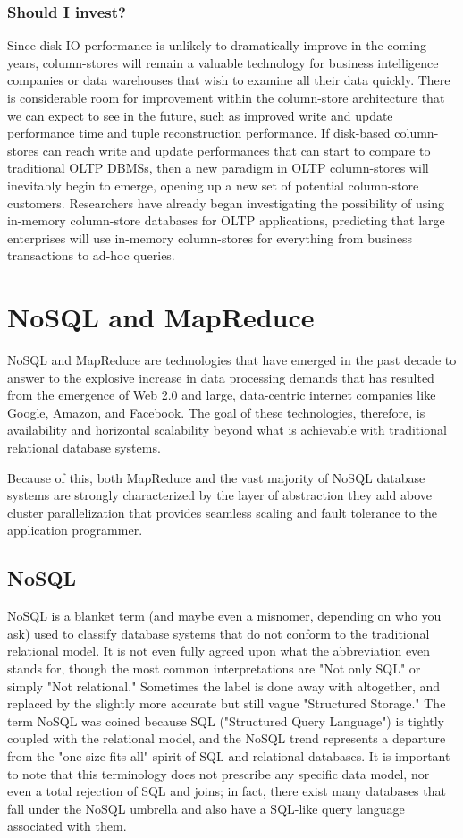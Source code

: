 \documentclass[11pt,a4paper]{report}
\begin{document}
\subsection{Should I invest?}
Since disk IO performance is unlikely to dramatically improve in the coming years, column-stores will remain a valuable technology for business intelligence companies or data warehouses that wish to examine all their data quickly. There is considerable room for improvement within the column-store architecture that we can expect to see in the future, such as improved write and update performance time and tuple reconstruction performance. If disk-based column-stores can reach write and update performances that can start to compare to traditional OLTP DBMSs, then a new paradigm in OLTP column-stores will inevitably begin to emerge, opening up a new set of potential column-store customers. Researchers have already began investigating the possibility of using in-memory column-store databases for OLTP applications, predicting that large enterprises will use in-memory column-stores for everything from business transactions to ad-hoc queries. \cite{plattner2009common}

\chapter{NoSQL and MapReduce}
NoSQL and MapReduce are technologies that have emerged in the past decade to answer to the explosive increase in data processing demands that has resulted from the emergence of Web 2.0 and large, data-centric internet companies like Google, Amazon, and Facebook.\cite{leavitt2010will} The goal of these technologies, therefore, is availability and horizontal scalability beyond what is achievable with traditional relational database systems.

Because of this, both MapReduce and the vast majority of NoSQL database systems are strongly characterized by the layer of abstraction they add above cluster parallelization that provides seamless scaling and fault tolerance to the application programmer. 


\section{NoSQL}
NoSQL is a blanket term (and maybe even a misnomer, depending on who you ask) used to classify database systems that do not conform to the traditional relational model. It is not even fully agreed upon what the abbreviation even stands for, though the most common interpretations are "Not only SQL" or simply "Not relational."\cite{cattell2011scalable} Sometimes the label is done away with altogether, and replaced by the slightly more accurate but still vague "Structured Storage." The term NoSQL was coined because SQL ("Structured Query Language") is tightly coupled with the relational model, and the NoSQL trend represents a departure from the "one-size-fits-all" spirit of SQL and relational databases.\cite{strauch2011nosql}  It is important to note that this terminology does not prescribe any specific data model, nor even a total rejection of SQL and joins; in fact, there exist many databases that fall under the NoSQL umbrella and also have a SQL-like query language associated with them. 
\end{document}
